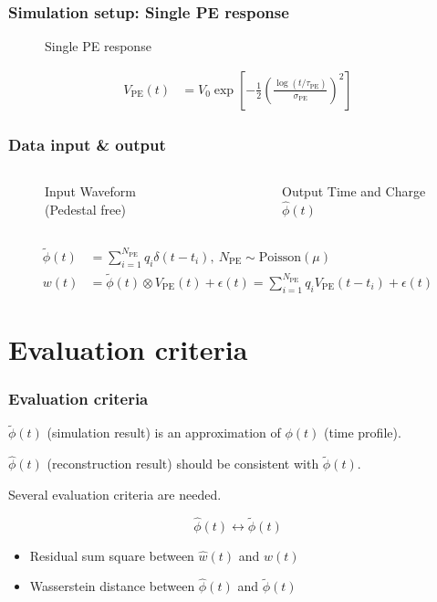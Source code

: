 \documentclass{beamer}
\begin{document}
\begin{CJK*}{UTF8}{gbsn}
\begin{frame}
\frametitle{Simulation setup: Single PE response}
\begin{figure}
    \centering
    \resizebox{0.6\textwidth}{!}{}
    \caption{Single PE response\cite{jetter_pmt_2012}}
\end{figure}
\begin{align*}
  V_\mathrm{PE}(t) &= V_{0}\exp\left[-\frac{1}{2}\left(\frac{\log(t/\tau_\mathrm{PE})}{\sigma_\mathrm{PE}}\right)^{2}\right]
\end{align*}
\end{frame}

\begin{frame}
\frametitle{Data input \& output}
\begin{columns}
\begin{figure}
    \centering
    \resizebox{1.0\textwidth}{!}{}
    \caption{Input Waveform (Pedestal free)}
\end{figure}
\begin{figure}
    \centering
    \resizebox{1.0\textwidth}{!}{}
    \caption{Output Time and Charge $\hat\phi(t)$}
\end{figure}
\end{columns}
\begin{align*}
  \tilde{\phi}(t) &= \sum_{i=1}^{N_{\mathrm{PE}}} q_i \delta(t-t_i), \ N_{\mathrm{PE}}\sim \mathrm{Poisson}(\mu) \\
  w(t) &= \tilde{\phi}(t) \otimes V_\mathrm{PE}(t) + \epsilon(t) = \sum_{i=1}^{N_\mathrm{PE}} q_i V_\mathrm{PE}(t-t_i) + \epsilon(t)
\end{align*}
\end{frame}

\section{Evaluation criteria}

\begin{frame}
\frametitle{Evaluation criteria}
$\tilde{\phi}(t)$ (simulation result) is an approximation of $\phi(t)$ (time profile). 

$\hat{\phi}(t)$ (reconstruction result) should be consistent with $\tilde{\phi}(t)$. 

Several evaluation criteria are needed. 
\begin{block}{}
\begin{equation*}
    \hat{\phi}(t) \leftrightarrow \tilde{\phi}(t)
\end{equation*}
\end{block}
\begin{itemize}
    \item Residual sum square between $\hat{w}(t)$ and $w(t)$
    \item Wasserstein distance between $\hat{\phi}(t)$ and $\tilde{\phi}(t)$
\end{itemize}
\end{frame}


\end{CJK*}
\end{document}
